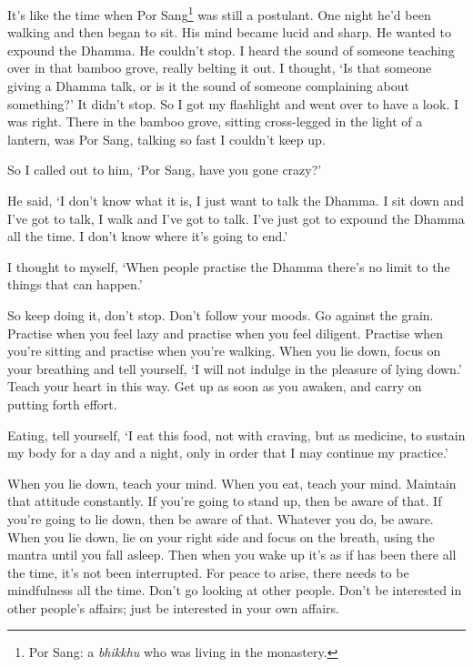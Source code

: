 It's like the time when Por Sang\footnote{Por Sang: a \textit{bhikkhu} who was living in the monastery.} was still a postulant. One night he'd been walking  and then began to sit. His mind became lucid and sharp. He wanted to expound the Dhamma. He couldn't stop. I heard the sound of someone teaching over in that bamboo grove, really belting it out. I thought, `Is that someone giving a Dhamma talk, or is it the sound of someone complaining about something?' It didn't stop. So I got my flashlight and went over to have a look. I was right. There in the bamboo grove, sitting cross-legged in the light of a lantern, was Por Sang, talking so fast I couldn't keep up.

So I called out to him, `Por Sang, have you gone crazy?'

He said, `I don't know what it is, I just want to talk the Dhamma. I sit down and I've got to talk, I walk and I've got to talk. I've just got to expound the Dhamma all the time. I don't know where it's going to end.'

I thought to myself, `When people practise the Dhamma there's no limit to the things that can happen.'

So keep doing it, don't stop. Don't follow your moods. Go against the grain. Practise when you feel lazy and practise when you feel diligent. Practise when you're sitting and practise when you're walking. When you lie down, focus on your breathing and tell yourself, `I will not indulge in the pleasure of lying down.' Teach your heart in this way. Get up as soon as you awaken, and carry on putting forth effort.

Eating, tell yourself, `I eat this food, not with craving, but as medicine, to sustain my body for a day and a night, only in order that I may continue my practice.'

When you lie down, teach your mind. When you eat, teach your mind. Maintain that attitude constantly. If you're going to stand up, then be aware of that. If you're going to lie down, then be aware of that. Whatever you do, be aware. When you lie down, lie on your right side and focus on the breath, using the mantra  until you fall asleep. Then when you wake up it's as if  has been there all the time, it's not been interrupted. For peace to arise, there needs to be mindfulness all the time. Don't go looking at other people. Don't be interested in other people's affairs; just be interested in your own affairs.

